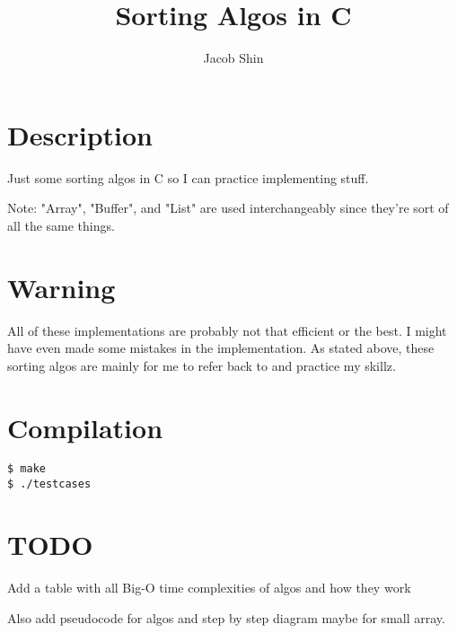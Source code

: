\documentclass{article}
\title{Sorting Algos in C}
\author{Jacob Shin}
\begin{document}
\maketitle
\section{Description}
Just some sorting algos in C so I can practice implementing stuff.

Note: "Array", "Buffer", and "List" are used interchangeably since they're sort of all the same things.

\section{Warning}
All of these implementations are probably not that efficient or the best. I might have even made some mistakes in the implementation.  
As stated above, these sorting algos are mainly for me to refer back to and practice my skillz.

\section{Compilation}

\begin{verbatim} 
$ make
$ ./testcases
\end{verbatim}

\section{TODO}
Add a table with all Big-O time complexities of algos and how they work

Also add pseudocode for algos and step by step diagram maybe for small array.
\end{document}
